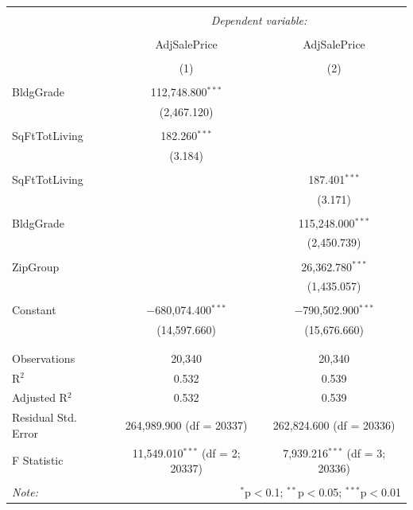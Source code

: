 \documentclass[12pt,letterpaper]{article}
\begin{document}
\newpage
\begin{table}[!htbp] \centering 
	\caption{} 
	\label{} 
	\begin{tabular}{@{\extracolsep{5pt}}lcc} 
		\\[-1.8ex]\hline 
		\hline \\[-1.8ex] 
		& \multicolumn{2}{c}{\textit{Dependent variable:}} \\ 
		\cline{2-3} 
		\\[-1.8ex] & AdjSalePrice & AdjSalePrice \\ 
		\\[-1.8ex] & (1) & (2)\\ 
		\hline \\[-1.8ex] 
		BldgGrade & 112,748.800$^{***}$ &  \\ 
		& (2,467.120) &  \\ 
		& & \\ 
		SqFtTotLiving & 182.260$^{***}$ &  \\ 
		& (3.184) &  \\ 
		& & \\ 
		SqFtTotLiving &  & 187.401$^{***}$ \\ 
		&  & (3.171) \\ 
		& & \\ 
		BldgGrade &  & 115,248.000$^{***}$ \\ 
		&  & (2,450.739) \\ 
		& & \\ 
		ZipGroup &  & 26,362.780$^{***}$ \\ 
		&  & (1,435.057) \\ 
		& & \\ 
		Constant & $-$680,074.400$^{***}$ & $-$790,502.900$^{***}$ \\ 
		& (14,597.660) & (15,676.660) \\ 
		& & \\ 
		\hline \\[-1.8ex] 
		Observations & 20,340 & 20,340 \\ 
		R$^{2}$ & 0.532 & 0.539 \\ 
		Adjusted R$^{2}$ & 0.532 & 0.539 \\ 
		Residual Std. Error & 264,989.900 (df = 20337) & 262,824.600 (df = 20336) \\ 
		F Statistic & 11,549.010$^{***}$ (df = 2; 20337) & 7,939.216$^{***}$ (df = 3; 20336) \\ 
		\hline 
		\hline \\[-1.8ex] 
		\textit{Note:}  & \multicolumn{2}{r}{$^{*}$p$<$0.1; $^{**}$p$<$0.05; $^{***}$p$<$0.01} \\ 
	\end{tabular} 
\end{table}
\end{document}
